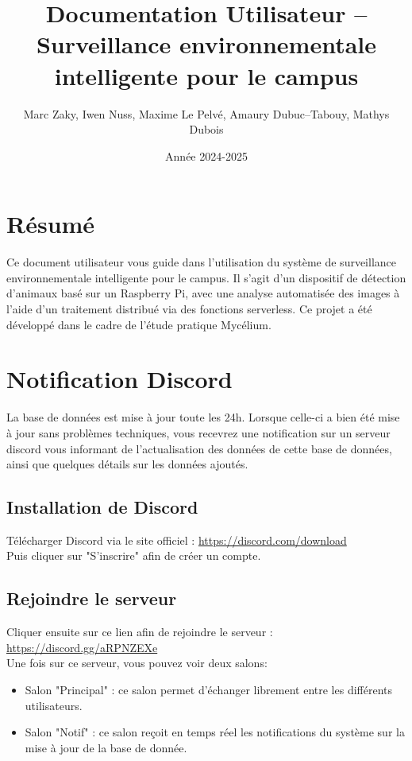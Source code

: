 \documentclass[a4paper,11pt]{article}
\title{Documentation Utilisateur – Surveillance environnementale intelligente pour le campus}
\author{Marc Zaky, Iwen Nuss, Maxime Le Pelvé, Amaury Dubuc--Tabouy, Mathys Dubois}
\date{Année 2024-2025}
\begin{document}
	
	\maketitle
	
	\section*{Résumé}
	Ce document utilisateur vous guide dans l’utilisation du système de surveillance environnementale intelligente pour le campus. Il s’agit d’un dispositif de détection d’animaux basé sur un Raspberry Pi, avec une analyse automatisée des images à l’aide d’un traitement distribué via des fonctions serverless. Ce projet a été développé dans le cadre de l’étude pratique Mycélium.
	
	\tableofcontents
	\newpage
	
	\section{Notification Discord}
	La base de données est mise à jour toute les 24h. Lorsque celle-ci a bien été mise à jour sans problèmes techniques, vous recevrez une notification sur un serveur discord vous informant de l'actualisation des données de cette base de données, ainsi que quelques détails sur les données ajoutés.
	
	\subsection{Installation de Discord}
	Télécharger Discord via le site officiel : \url{https://discord.com/download}\\
	Puis cliquer sur "S'inscrire" afin de créer un compte.
	
	\subsection{Rejoindre le serveur}
	
	Cliquer ensuite sur ce lien afin de rejoindre le serveur  : \url{https://discord.gg/aRPNZEXe}\\
	Une fois sur ce serveur, vous pouvez voir deux salons: 
	\begin{itemize}
		\item Salon "Principal" : ce salon permet d'échanger librement entre les différents utilisateurs.
		\item Salon "Notif" : ce salon reçoit en temps réel les notifications du système sur la mise à jour de la base de donnée.
	\end{itemize}
	
\end{document}
